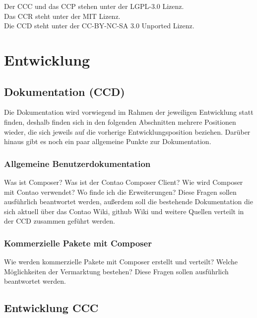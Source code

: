 \documentclass[
paper=a4,
draft=false,%
fontsize=10pt%
]{scrartcl}
\begin{document}
Der CCC und das CCP stehen unter der LGPL-3.0 Lizenz.\\
Das CCR steht unter der MIT Lizenz. \\
Die CCD steht unter der CC-BY-NC-SA 3.0 Unported Lizenz.

%
%

\newpage

\section{Entwicklung}
\label{sec:development}

\subsection{Dokumentation (CCD)}
\label{subsec:ccd}

Die Dokumentation wird vorwiegend im Rahmen der jeweiligen Entwicklung statt finden, deshalb finden sich in den folgenden Abschnitten mehrere Positionen  wieder, die sich jeweils auf die vorherige Entwicklungsposition beziehen. Darüber hinaus gibt es noch ein paar allgemeine Punkte zur Dokumentation.

\subsubsection{Allgemeine Benutzerdokumentation}

Was ist Composer? Was ist der Contao Composer Client? Wie wird Composer mit Contao verwendet? Wo finde ich die Erweiterungen?
Diese Fragen sollen ausführlich beantwortet werden, außerdem soll die bestehende Dokumentation die sich aktuell über das Contao Wiki, github Wiki und weitere Quellen verteilt in der CCD zusammen geführt werden.

\subsubsection{Kommerzielle Pakete mit Composer}

Wie werden kommerzielle Pakete mit Composer erstellt und verteilt? Welche Möglichkeiten der Vermarktung bestehen? Diese Fragen sollen ausführlich beantwortet werden.

\subsection{Entwicklung CCC}
\label{subsec:ccc}
\end{document}
